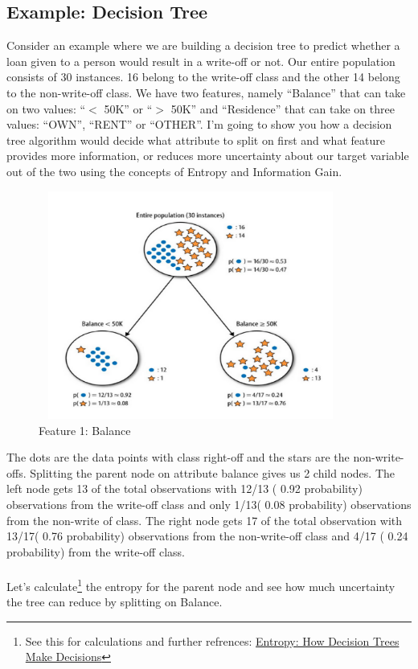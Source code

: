 \documentclass[12pt, A4]{report}
\begin{document}
\subsection*{Example: Decision Tree}
	Consider an example where we are building a decision tree to predict whether a loan given to a person would result in a write-off or not. Our entire population consists of 30 instances. 16 belong to the write-off class and the other 14 belong to the non-write-off class. We have two features, namely “Balance” that can take on two values: “$<$ 50K” or “$>$ 50K” and “Residence” that can take on three values: “OWN”, “RENT” or “OTHER”. I’m going to show you how a decision tree algorithm would decide what attribute to split on first and what feature provides more information, or reduces more uncertainty about our target variable out of the two using the concepts of Entropy and Information Gain.
	\begin{figure}[h]
		\centering
		\includegraphics[width=10cm, height=7.5cm]{tree1.png}
		\caption{Feature 1: Balance}
	\end{figure}
	The dots are the data points with class right-off and the stars are the non-write-offs. Splitting the parent node on attribute balance gives us 2 child nodes. The left node gets 13 of the total observations with 12/13 ( 0.92 probability) observations from the write-off class and only 1/13( 0.08 probability) observations from the non-write of class. The right node gets 17 of the total observation with 13/17( 0.76 probability) observations from the non-write-off class and 4/17 ( 0.24 probability) from the write-off class.
	\\ \\Let’s calculate\footnote[1]{See this for calculations and further refrences: \href{https://towardsdatascience.com/entropy-how-decision-trees-make-decisions-2946b9c18c8}{Entropy: How Decision Trees Make Decisions}} the entropy for the parent node and see how much uncertainty the tree can reduce by splitting on Balance.	
\end{document}
